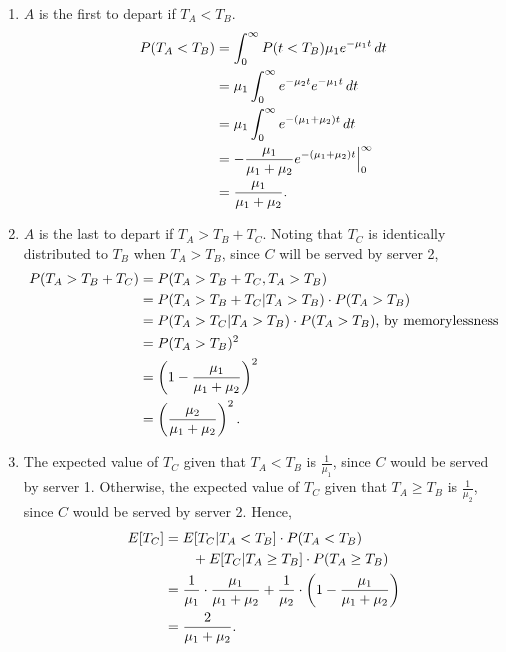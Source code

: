 \documentclass{article}
\begin{document}
\begin{enumerate}
    \begin{enumerate}
    \item
        $A$ is the first to depart if $T_A<T_B$.
        \[\begin{split}
        P(T_A<T_B)  & = \int_0^\infty P( t < T_B )\mu_1e^{-\mu_1t}\, dt \\
                & = \mu_1\int_0^\infty e^{-\mu_2t}e^{-\mu_1t}\, dt \\
                & = \mu_1\int_0^\infty e^{-(\mu_1+\mu_2)t}\, dt \\
                & = -\frac{\mu_1}{\mu_1+\mu_2}e^{-(\mu_1+\mu_2)t}\Big|_0^\infty \\
                & = \frac{\mu_1}{\mu_1+\mu_2}\text. \\
        \end{split}\]
    \item
        $A$ is the last to depart if $T_A>T_B+T_C$. Noting that $T_C$ is identically distributed to $T_B$ when $T_A>T_B$,
        since $C$ will be served by server 2,
        \[\begin{split}
        P(T_A>T_B+T_C)  & = P(T_A>T_B+T_C,T_A>T_B) \\
                        & = P(T_A>T_B+T_C|T_A>T_B) \cdot P(T_A>T_B) \\
                        & = P(T_A>T_C|T_A>T_B) \cdot P(T_A>T_B) \text{, by memorylessness} \\
                        & = P(T_A>T_B)^2 \\
                        & = \left(1-\frac{\mu_1}{\mu_1+\mu_2}\right)^2 \\
                        & = \left(\frac{\mu_2}{\mu_1+\mu_2}\right)^2\text. \\
        \end{split}\]
    \item
        The expected value of $T_C$ given that $T_A<T_B$ is $\frac{1}{\mu_1}$, since $C$ would be served by server 1.
        Otherwise, the expected value of $T_C$ given that $T_A\geq T_B$ is $\frac{1}{\mu_2}$, since $C$ would be served by server 2.
        Hence,
        \[\begin{split}
        E[T_C]  & = E[T_C|T_A<T_B]\cdot P(T_A<T_B) \\& \qquad + E[T_C|T_A\geq T_B]\cdot P(T_A\geq T_B) \\
                & = \frac{1}{\mu_1}\cdot \frac{\mu_1}{\mu_1+\mu_2} + \frac{1}{\mu_2}\cdot \left(1-\frac{\mu_1}{\mu_1+\mu_2}\right) \\
                & = \frac{2}{\mu_1+\mu_2}\text. \\
        \end{split}\]


\end{enumerate}
\end{enumerate}
\end{document}

